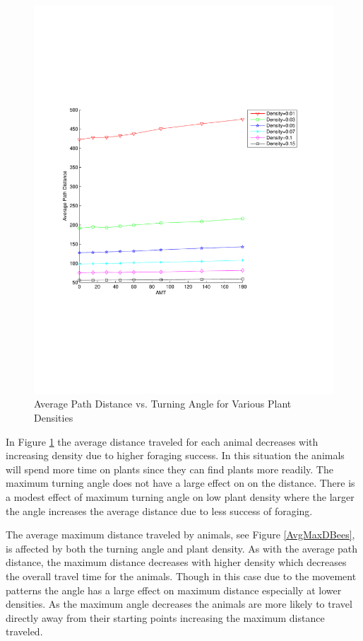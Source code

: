 \documentclass{tran-l}
\theoremstyle{definition}
\theoremstyle{remark}
\numberwithin{equation}{subsection}
\begin{document}
\begin{figure}
  \begin{center}
  \includegraphics[width=.5\linewidth,scale=.5]{PathVsAMT.pdf}
  \end{center}
  \caption{\small Average Path Distance vs. Turning Angle for Various Plant
Densities}
  \label{AvgPathN}
\end{figure}


In Figure \ref{AvgPathN} the average distance traveled for each animal decreases with increasing density due to higher foraging success.  In this situation the animals will spend more time on plants since they can find plants more readily.  The maximum turning angle does not have a large effect on on the distance.  There is a modest effect of maximum turning angle on low plant density where the larger the angle increases the average distance due to less success of foraging.



The average maximum distance traveled by animals, see Figure \ref{AvgMaxDBees},
is affected by both the turning angle and plant density. As with the average path distance, the maximum distance decreases with higher density which decreases the overall travel time for the animals.  Though in this case due to the movement patterns the angle has a large effect on maximum distance especially at lower densities.  As the maximum angle decreases the animals are more likely to travel directly away from their starting points increasing the maximum distance traveled.
\end{document}
